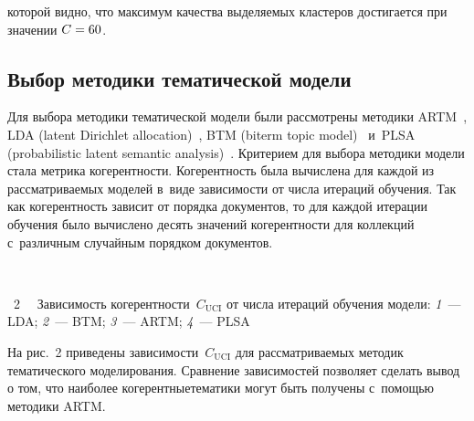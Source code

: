 \begin{multicols}{2}
\columnbreak

\noindent
     которой видно, что максимум качества 
выделяемых кластеров достигается при значении $C \hm= 60$.

    \subsection{Выбор методики тематической модели}
    
    Для выбора методики тематической модели были рассмотрены методики 
    ARTM~\cite{vorontsov2015additive}, LDA
    (latent Dirichlet allocation)~\cite{blei2003latent}, 
    BTM (biterm topic model)~\cite{cheng2014btm} и~PLSA
    (probabilistic latent semantic analysis)~\cite{hofmann1999probabilistic}.
    Критерием для выбора методики модели стала метрика ко\-ге\-рент\-ности.
    Ко\-ге\-рент\-ность была вы\-чис\-ле\-на для каждой из рас\-смат\-ри\-ва\-емых моделей в~виде 
зависимости от числа итераций обучения.
    Так как когерентность зависит от порядка документов, то для каждой 
итерации обучения было вычислено десять значений когерентности для коллекций 
с~различным случайным порядком документов.
    
    { \begin{center}  %
 \vspace*{12pt}
    \mbox{%
 \epsfxsize=79mm 
 }

\end{center}

\noindent
{{\figurename~2}\ \ \small{
Зависимость когерентности~$C_{\mathrm{UCI}}$ от числа    итераций 
обучения модели: \textit{1}~--- LDA; \textit{2}~--- BTM; \textit{3}~--- ARTM; \textit{4}~---
PLSA
}}}

\vspace*{12pt}
    

    
    На рис.~2 
    приведены зависимости~$C_{\mathrm{UCI}}$  для 
рассматриваемых методик тематического моделирования.
    Сравнение зависимостей позволяет сделать вывод о том, что наиболее 
когерентные\linebreak тематики могут быть получены с~помощью методики ARTM.
{ %

}

   


\end{multicols}
